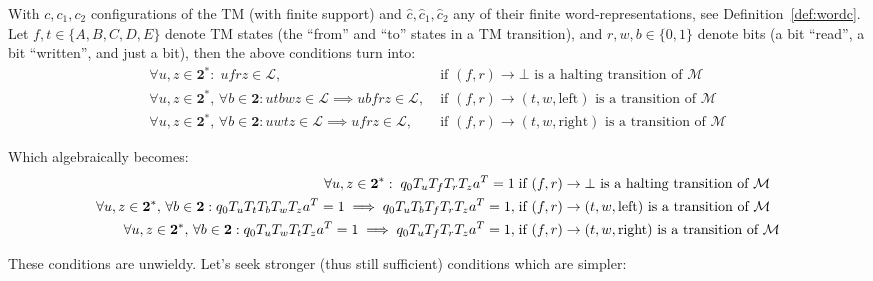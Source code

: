 With $c, c_1, c_2$ configurations of the TM (with finite support) and $\hat{c}, \hat{c}_1, \hat{c}_2$ any of their finite word-representations, see Definition~\ref{def:wordc}. Let $f,t \in \{A,B,C,D,E\}$ denote TM states (the ``from'' and ``to'' states in a TM transition), and $r,w,b \in \{0,1\}$ denote bits (a bit ``read'', a bit ``written'', and just a bit), then the above conditions turn into:
\begin{align*}
  \forall u,z\in\mathbf{2}^*: \; ufrz \in \mathcal{L},\;                                                             & \text{if $(f,r) \to \bot$ is a halting transition of $\mathcal{M}$}
  \\
  \forall u,z\in\mathbf{2}^*,\,\forall b \in \mathbf{2}: utbwz \in \mathcal{L} \implies ubfrz \in \mathcal{L},\;     & \text{if $(f,r) \to (t,w,\text{left})$ is a transition of $\mathcal{M}$}
  \\
  \forall u,z\in\mathbf{2}^*,\,\forall b \in \mathbf{2}: u w t z \in \mathcal{L} \implies u f r z \in \mathcal{L},\; & \text{if $(f,r) \to (t,w,\text{right})$ is a transition of $\mathcal{M}$}
\end{align*}

Which algebraically becomes:
\begin{align*}
  \forall u,z\in\mathbf{2}^*: \; q_0 T_u T_f T_r T_z a^T = 1 \;                                                                              & \text{if $(f,r) \to \bot$ is a halting transition of $\mathcal{M}$}
  \\
  \forall u,z\in\mathbf{2}^*,\,\forall b \in \mathbf{2}: q_0 T_{u} T_t T_b T_w T_{z} a^T = 1 \implies q_0 T_{u} T_b T_f T_r T_{z} a^T = 1,\; & \text{if $(f,r) \to (t,w,\text{left})$ is a transition of $\mathcal{M}$}
  \\
  \forall u,z\in\mathbf{2}^*,\,\forall b \in \mathbf{2}: q_0 T_{u} T_w T_t T_{z} a^T = 1 \implies q_0 T_{u} T_f T_r T_{z} a^T = 1,\;         & \text{if $(f,r) \to (t,w,\text{right})$ is a transition of $\mathcal{M}$}
\end{align*}

These conditions are unwieldy. Let's seek stronger (thus still sufficient) conditions which are simpler:

